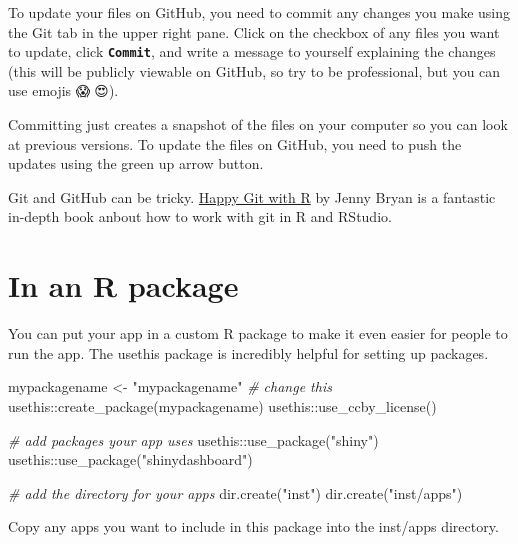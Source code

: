 \documentclass[
  oneside]{book}
\newenvironment{Shaded}{\begin{snugshade}}{\end{snugshade}}
\newcommand{\CommentTok}[1]{\textcolor[rgb]{0.56,0.35,0.01}{\textit{#1}}}
\newcommand{\FunctionTok}[1]{\textcolor[rgb]{0.00,0.00,0.00}{#1}}
\newcommand{\NormalTok}[1]{#1}
\newcommand{\OtherTok}[1]{\textcolor[rgb]{0.56,0.35,0.01}{#1}}
\newcommand{\SpecialCharTok}[1]{\textcolor[rgb]{0.00,0.00,0.00}{#1}}
\newcommand{\StringTok}[1]{\textcolor[rgb]{0.31,0.60,0.02}{#1}}
\begin{document}
To update your files on GitHub, you need to commit any changes you make using the Git tab in the upper right pane. Click on the checkbox of any files you want to update, click \textbf{\texttt{Commit}}, and write a message to yourself explaining the changes (this will be publicly viewable on GitHub, so try to be professional, but you can use emojis 😱🤪😍).

Committing just creates a snapshot of the files on your computer so you can look at previous versions. To update the files on GitHub, you need to push the updates using the green up arrow button.

\begin{info}
Git and GitHub can be tricky. \href{https://happygitwithr.com/}{Happy Git with R} by Jenny Bryan is a fantastic in-depth book anbout how to work with git in R and RStudio.

\end{info}

\hypertarget{in-an-r-package}{%
\section{In an R package}\label{in-an-r-package}}

You can put your app in a custom R package to make it even easier for people to run the app. The usethis package is incredibly helpful for setting up packages.

\begin{Shaded}
\begin{Highlighting}[]
\NormalTok{mypackagename }\OtherTok{\textless{}{-}} \StringTok{"mypackagename"}  \CommentTok{\# change this}
\NormalTok{usethis}\SpecialCharTok{::}\FunctionTok{create\_package}\NormalTok{(mypackagename)}
\NormalTok{usethis}\SpecialCharTok{::}\FunctionTok{use\_ccby\_license}\NormalTok{()}

\CommentTok{\# add packages your app uses}
\NormalTok{usethis}\SpecialCharTok{::}\FunctionTok{use\_package}\NormalTok{(}\StringTok{"shiny"}\NormalTok{)}
\NormalTok{usethis}\SpecialCharTok{::}\FunctionTok{use\_package}\NormalTok{(}\StringTok{"shinydashboard"}\NormalTok{)}

\CommentTok{\# add the directory for your apps}
\FunctionTok{dir.create}\NormalTok{(}\StringTok{"inst"}\NormalTok{)}
\FunctionTok{dir.create}\NormalTok{(}\StringTok{"inst/apps"}\NormalTok{)}
\end{Highlighting}
\end{Shaded}

Copy any apps you want to include in this package into the inst/apps directory.
\end{document}
